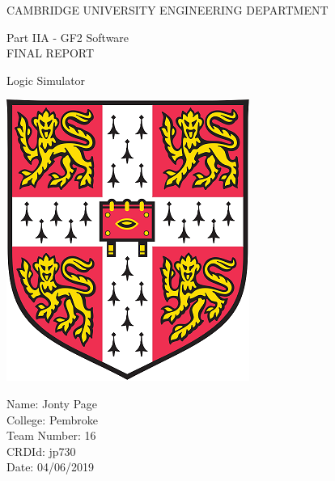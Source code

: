 \documentclass{article}					%
\begin{document}


\begin{titlepage} 						%
\centering								%

\vspace*{\fill}							%

\huge{CAMBRIDGE UNIVERSITY ENGINEERING DEPARTMENT}\\		%
\vspace{1 cm}

\LARGE{Part IIA - GF2 Software}\\
\LARGE{FINAL REPORT}
\vspace{1.5 cm}

\begin{mdframed}						%
\centering
\LARGE{Logic Simulator}
\end{mdframed}

\vspace{0.25 cm}

\begin{center}
\includegraphics{cambridge}
\end{center}

\vspace{0.5 cm}

\begin{flushleft}
\large{Name: Jonty Page\\				%
College: Pembroke\\
Team Number: 16\\
CRDId: jp730\\
Date: 04/06/2019\\}


\end{flushleft}
\end{titlepage}
\end{document}
